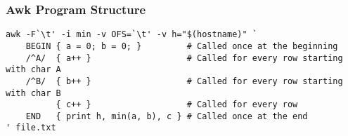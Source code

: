 \documentclass[documentation]{subfiles}
\begin{document}
\subsubsection{Awk Program Structure}

\begin{verbatim}
awk -F`\t' -i min -v OFS=`\t' -v h="$(hostname)" `
    BEGIN { a = 0; b = 0; }         # Called once at the beginning
    /^A/  { a++ }                   # Called for every row starting with char A
    /^B/  { b++ }                   # Called for every row starting with char B
          { c++ }                   # Called for every row
    END   { print h, min(a, b), c } # Called once at the end
' file.txt
\end{verbatim}
\end{document}
